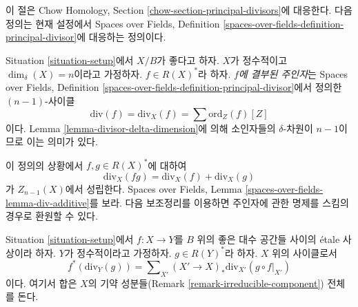 \noindent
이 절은 Chow Homology, Section
\ref{chow-section-principal-divisors}에 대응한다.
다음 정의는 현재 설정에서 Spaces over Fields, Definition
\ref{spaces-over-fields-definition-principal-divisor}에 대응하는 정의이다.

\begin{definition}
\label{definition-principal-divisor}
Situation \ref{situation-setup}에서 $X/B$가 좋다고 하자.
$X$가 정수적이고 $\dim_\delta(X) = n$이라고 가정하자.
$f \in R(X)^*$라 하자. {\it $f$에 결부된 주인자}는 Spaces over Fields,
Definition \ref{spaces-over-fields-definition-principal-divisor}에서 정의한
$(n - 1)$-사이클
$$
\text{div}(f) = \text{div}_X(f) = \sum \text{ord}_Z(f) [Z]
$$
이다. Lemma \ref{lemma-divisor-delta-dimension}에 의해 소인자들의
$\delta$-차원이 $n - 1$이므로 이는 의미가 있다.
\end{definition}

\noindent
이 정의의 상황에서 $f, g \in R(X)^*$에 대하여
$$
\text{div}_X(fg) = \text{div}_X(f) + \text{div}_X(g)
$$
가 $Z_{n - 1}(X)$에서 성립한다. Spaces over Fields, Lemma
\ref{spaces-over-fields-lemma-div-additive}를 보라.
다음 보조정리를 이용하면 주인자에 관한 명제를 스킴의 경우로 환원할 수 있다.

\begin{lemma}
\label{lemma-etale-pullback-principal-divisor}
Situation \ref{situation-setup}에서 $f : X \to Y$를 $B$ 위의 좋은 대수
공간들 사이의 \'etale 사상이라 하자. $Y$가 정수적이라고 가정하자.
$g \in R(Y)^*$라 하자. $X$ 위의 사이클로서
$$
f^*(\text{div}_Y(g)) =
\sum\nolimits_{X'} (X' \to X)_*\text{div}_{X'}(g \circ f|_{X'})
$$
이다. 여기서 합은 $X$의 기약 성분들(Remark
\ref{remark-irreducible-component}) 전체를 돈다.
\end{lemma}

